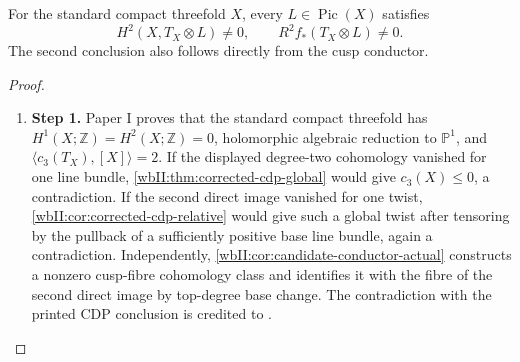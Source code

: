 \begin{corollary}
\hypertarget{tag-03IV}{}\label{wbII:test:cdp-comparison}

For the standard compact threefold $X$, every $L\in\operatorname{Pic}(X)$
satisfies
\[
 H^2(X,T_X\otimes L)\ne0,
 \qquad R^2f_*(T_X\otimes L)\ne0.
\]
The second conclusion also follows directly from the cusp conductor.
\end{corollary}


\begin{proof}
\begin{enumerate}[label={$\langle1\rangle$\arabic*.},leftmargin=*]
\item 
\noindent\textbf{Step 1.} Paper I proves that the standard compact threefold has
$H^1(X;\mathbb Z)=H^2(X;\mathbb Z)=0$, holomorphic algebraic reduction
to $\mathbb P^1$, and $\langle c_3(T_X),[X]\rangle=2$.
If the displayed degree-two cohomology vanished for one line bundle,
\cref{wbII:thm:corrected-cdp-global} would give $c_3(X)\le0$, a contradiction.
If the second direct image vanished for one twist,
\cref{wbII:cor:corrected-cdp-relative} would give such a global twist after
tensoring by the pullback of a sufficiently positive base line bundle,
again a contradiction. Independently,
\cref{wbII:cor:candidate-conductor-actual} constructs a nonzero cusp-fibre
cohomology class and identifies it with the fibre of the second direct
image by top-degree base change. The contradiction with the printed
CDP conclusion is credited to \citet[Section~10.2, Theorem~10.5]{AC2026}.

\end{enumerate}
\end{proof}